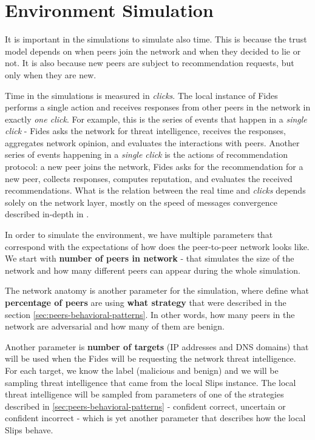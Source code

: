 \section{Environment Simulation}
\label{sec:environment-simulation}
It is important in the simulations to simulate also time. This is because the trust model depends on when peers join the network and when they decided to lie or not. It is also because new peers are subject to recommendation requests, but only when they are new.

Time in the simulations is measured in \textit{clicks}. 
The local instance of Fides performs a single action and receives responses from other peers in the network in exactly \textit{one click}. 
For example, this is the series of events that happen in a \textit{single click} - Fides asks the network for threat intelligence, receives the responses, aggregates network opinion, and evaluates the interactions with peers.
Another series of events happening in a \textit{single click} is the actions of  recommendation protocol: a new peer joins the network, Fides asks for the recommendation for  a new peer, collects responses, computes reputation, and evaluates the received recommendations.
What is the relation between the real time and \textit{clicks} depends solely on the network layer, mostly on the speed of messages convergence described in-depth in \cite{nl}.

In order to simulate the environment, we have multiple parameters that correspond with the expectations of how does the peer-to-peer network looks like.
We start with \textbf{number of peers in network} - that simulates the size of the network and how many different peers can appear during the whole simulation.

The network anatomy is another parameter for the simulation, where define what \textbf{percentage of peers} are using \textbf{what strategy} that were described in the section \ref{sec:peers-behavioral-patterns}. 
In other words, how many peers in the network are adversarial and how many of them are benign.

Another parameter is \textbf{number of targets} (IP addresses and DNS domains) that will be used when the Fides will be requesting the network threat intelligence.
For each target, we know the label (malicious and benign) and we will be sampling threat intelligence that came from the local Slips instance. 
The local threat intelligence will be sampled from parameters of one of the strategies described in \ref{sec:peers-behavioral-patterns} - confident correct, uncertain or confident incorrect - which is yet another parameter that describes how the local Slips behave.

